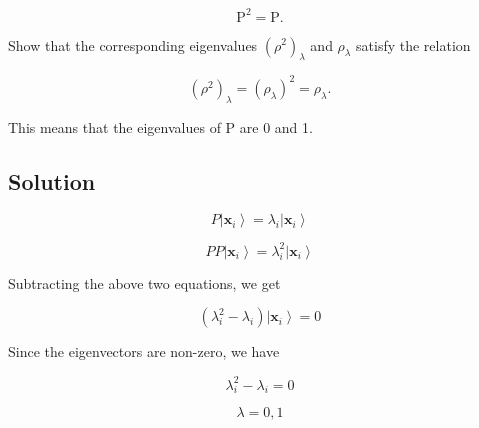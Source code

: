 \documentclass[12pt]{article}
\begin{document}
\[
    \mathrm{P}^2=\mathrm{P} .
\]

Show that the corresponding eigenvalues \({\left(\rho^2\right)}_\lambda \) and \(\rho_\lambda \) satisfy the relation

\[
    {\left(\rho^2\right)}_\lambda={\left(\rho_\lambda\right)}^2=\rho_\lambda .
\]

This means that the eigenvalues of \(\mathrm{P}\) are 0 and 1.

\subsection{Solution}

\[
    P \left|\mathbf{x}_i\right\rangle = \lambda_i \left|\mathbf{x}_i\right\rangle
\]

\[
    P P \left|\mathbf{x}_i\right\rangle = \lambda_i^2 \left|\mathbf{x}_i\right\rangle
\]

Subtracting the above two equations, we get

\[
    \left(\lambda_i^2 - \lambda_i\right) \left|\mathbf{x}_i\right\rangle = 0
\]

Since the eigenvectors are non-zero, we have

\[
    \lambda_i^2 - \lambda_i = 0
\]

\[
    \lambda = 0, 1
\]


\newpage


\nocite{El-Deeb_PEU-356_Assignments}
\end{document}
